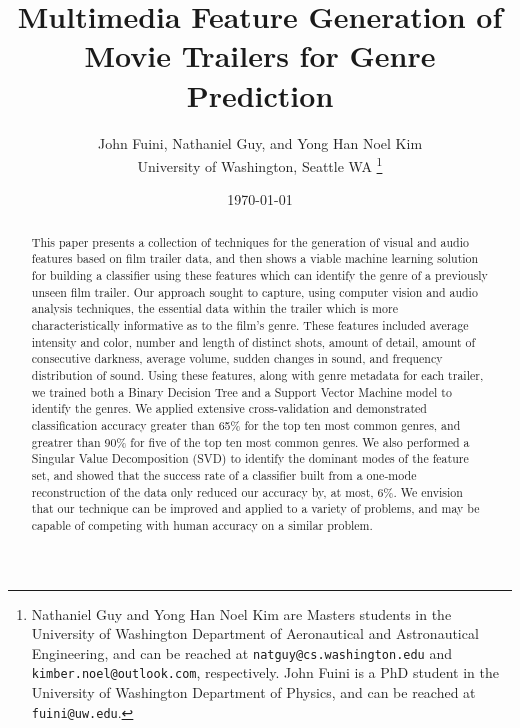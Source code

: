\documentclass[letterpaper, 10 pt, conference]{ieeeconf}  %
\title{\LARGE \bf
Multimedia Feature Generation of Movie Trailers for Genre Prediction\\
}
\author{John Fuini, Nathaniel Guy, and Yong Han Noel Kim\\
	University of Washington, Seattle WA%
\thanks{Nathaniel Guy and Yong Han Noel Kim are Masters students in the University of Washington Department of Aeronautical and Astronautical Engineering, and can be reached at {\tt\small natguy@cs.washington.edu} and {\tt\small kimber.noel@outlook.com}, respectively. John Fuini is a PhD student in the University of Washington Department of Physics, and can be reached at {\tt\small fuini@uw.edu}. }%
}
\date{ \today}
\begin{document}
\maketitle
\thispagestyle{empty}
\pagestyle{empty}

\begin{abstract}
This paper presents a collection of techniques for the generation of visual and audio features based on film trailer data, and then shows a viable machine learning solution for building a classifier using these features which can identify the genre of a previously unseen film trailer. Our approach sought to capture, using computer vision and audio analysis techniques, the essential data within the trailer which is more characteristically informative as to the film's genre. These features included average intensity and color, number and length of distinct shots, amount of detail, amount of consecutive darkness, average volume, sudden changes in sound, and frequency distribution of sound. Using these features, along with genre metadata for each trailer, we trained both a Binary Decision Tree and a Support Vector Machine model to identify the genres. We applied extensive cross-validation and demonstrated classification accuracy greater than 65\% for the top ten most common genres, and greatrer than 90\% for five of the top ten most common genres. We also performed a Singular Value Decomposition (SVD) to identify the dominant modes of the feature set, and showed that the success rate of a classifier built from a one-mode reconstruction of the data only reduced our accuracy by, at most, 6\%. We envision that our technique can be improved and applied to a variety of problems, and may be capable of competing with human accuracy on a similar problem.
\end{abstract}

\end{document}
